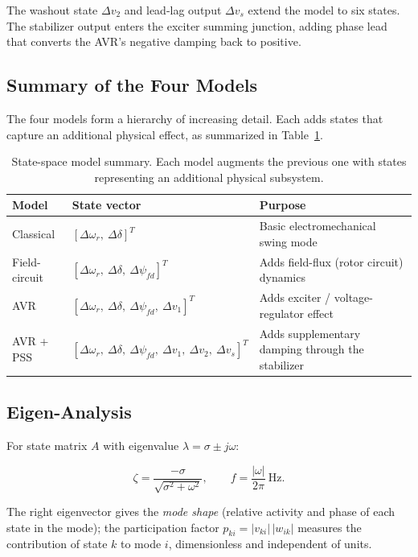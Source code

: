 \documentclass[12pt,a4paper]{article}
\newcommand{\dwr}{\Delta\omega_r}
\newcommand{\ddel}{\Delta\delta}
\newcommand{\dpsifd}{\Delta\psi_{fd}}
\begin{document}
The washout state $\Delta v_2$ and lead-lag output $\Delta v_s$ extend the model
to six states. The stabilizer output enters the exciter summing junction, adding
phase lead that converts the AVR's negative damping back to positive.

\subsection{Summary of the Four Models}

The four models form a hierarchy of increasing detail. Each adds states that
capture an additional physical effect, as summarized in
Table~\ref{tab:statevec}.

\begin{table}[H]
\centering
\caption{State-space model summary. Each model augments the previous one with
states representing an additional physical subsystem.}
\label{tab:statevec}
\begin{tabular}{@{}l l p{5.6cm}@{}}
\toprule
Model & State vector & Purpose \\
\midrule
Classical    & $[\dwr,\ \ddel]^T$
             & Basic electromechanical swing mode \\
Field-circuit & $[\dwr,\ \ddel,\ \dpsifd]^T$
             & Adds field-flux (rotor circuit) dynamics \\
AVR          & $[\dwr,\ \ddel,\ \dpsifd,\ \Delta v_1]^T$
             & Adds exciter / voltage-regulator effect \\
AVR + PSS    & $[\dwr,\ \ddel,\ \dpsifd,\ \Delta v_1,\ \Delta v_2,\ \Delta v_s]^T$
             & Adds supplementary damping through the stabilizer \\
\bottomrule
\end{tabular}
\end{table}

\subsection{Eigen-Analysis}

For state matrix $A$ with eigenvalue $\lambda = \sigma \pm j\omega$:

\begin{equation}
\zeta = \frac{-\sigma}{\sqrt{\sigma^2+\omega^2}},
\qquad
f = \frac{|\omega|}{2\pi}\ \text{Hz}.
\end{equation}

The right eigenvector gives the \textit{mode shape} (relative activity and phase
of each state in the mode); the participation factor
$p_{ki} = |v_{ki}|\,|w_{ik}|$ measures the contribution of state $k$ to mode
$i$, dimensionless and independent of units.
\end{document}
